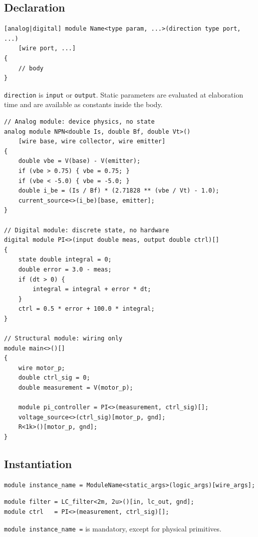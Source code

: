\documentclass[11pt, a4paper]{article}
\newcommand{\code}[1]{\texttt{\small #1}}
\begin{document}
\subsection{Declaration}

\begin{lstlisting}
[analog|digital] module Name<type param, ...>(direction type port, ...)
    [wire port, ...]
{
    // body
}
\end{lstlisting}

\code{direction} is \code{input} or \code{output}. Static parameters are
evaluated at elaboration time and are available as constants inside the body.

\begin{lstlisting}
// Analog module: device physics, no state
analog module NPN<double Is, double Bf, double Vt>()
    [wire base, wire collector, wire emitter]
{
    double vbe = V(base) - V(emitter);
    if (vbe > 0.75) { vbe = 0.75; }
    if (vbe < -5.0) { vbe = -5.0; }
    double i_be = (Is / Bf) * (2.71828 ** (vbe / Vt) - 1.0);
    current_source<>(i_be)[base, emitter];
}

// Digital module: discrete state, no hardware
digital module PI<>(input double meas, output double ctrl)[]
{
    state double integral = 0;
    double error = 3.0 - meas;
    if (dt > 0) {
        integral = integral + error * dt;
    }
    ctrl = 0.5 * error + 100.0 * integral;
}

// Structural module: wiring only
module main<>()[]
{
    wire motor_p;
    double ctrl_sig = 0;
    double measurement = V(motor_p);

    module pi_controller = PI<>(measurement, ctrl_sig)[];
    voltage_source<>(ctrl_sig)[motor_p, gnd];
    R<1k>()[motor_p, gnd];
}
\end{lstlisting}

\subsection{Instantiation}

\begin{lstlisting}
module instance_name = ModuleName<static_args>(logic_args)[wire_args];
\end{lstlisting}

\begin{lstlisting}
module filter = LC_filter<2m, 2u>()[in, lc_out, gnd];
module ctrl   = PI<>(measurement, ctrl_sig)[];
\end{lstlisting}

\code{module instance\_name =} is mandatory, except for physical primitives.
\end{document}
